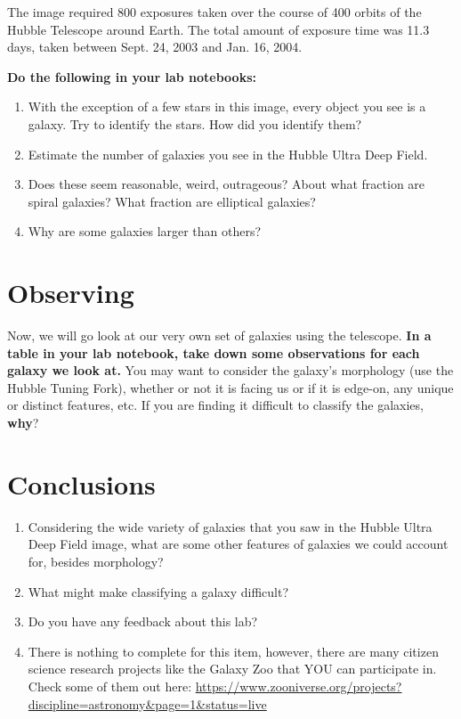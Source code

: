 \documentclass[11pt]{article}
\begin{document}
\medskip \noindent
The image required 800 exposures taken over the course of 400 orbits of the Hubble Telescope around Earth. The total amount of exposure time was 11.3 days, taken between Sept. 24, 2003 and Jan. 16, 2004.

\medskip \noindent
\textbf{Do the following in your lab notebooks:}
\begin{enumerate}
    \item With the exception of a few stars in this image, every object you see is a galaxy.  Try to identify the stars. How did you identify them?
    \item Estimate the number of galaxies you see in the Hubble Ultra Deep Field.
    \item Does these seem reasonable, weird, outrageous?  About what fraction are spiral galaxies?  What fraction are elliptical galaxies?
    \item Why are some galaxies larger than others?
\end{enumerate}


\section{Observing}
Now, we will go look at our very own set of galaxies using the telescope.  \textbf{In a table in your lab notebook, take down some observations for each galaxy we look at.}  You may want to consider the galaxy's morphology (use the Hubble Tuning Fork), whether or not it is facing us or if it is edge-on, any unique or distinct features, etc.  If you are finding it difficult to classify the galaxies, \textbf{why}?

\section{Conclusions}

\begin{enumerate}
    \item Considering the wide variety of galaxies that you saw in the Hubble Ultra Deep Field image, what are some other features of galaxies we could account for, besides morphology?
    \item What might make classifying a galaxy difficult?
    \item Do you have any feedback about this lab?
    \item There is nothing to complete for this item, however, there are many citizen science research projects like the Galaxy Zoo that YOU can participate in. Check some of them out here: \url{https://www.zooniverse.org/projects?discipline=astronomy&page=1&status=live}
\end{enumerate}
\end{document}
